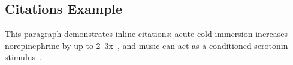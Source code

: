 \documentclass[11pt]{article}
\begin{document}
\subsection{Citations Example}
This paragraph demonstrates inline citations: acute cold immersion increases norepinephrine by up to 2–3x~\cite{Brenner2001}, and music can act as a conditioned serotonin stimulus~\cite{PBS2023}.


\newpage


\end{document}
